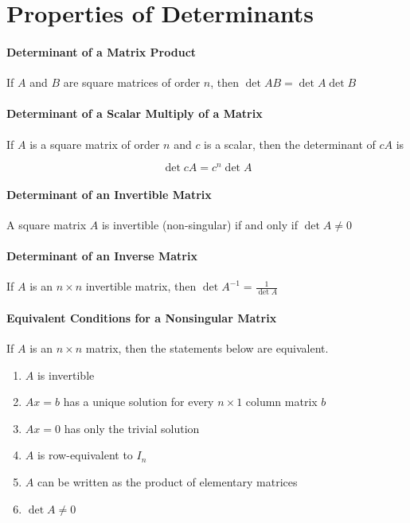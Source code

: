 \documentclass{report}
\begin{document}
\section{Properties of Determinants}

\paragraph{Determinant of a Matrix Product} If $A$ and $B$ are square matrices of order $n$, then $\det{AB} = \det{A}\det{B}$

\paragraph{Determinant of a Scalar Multiply of a Matrix} If $A$ is a square matrix of order $n$ and $c$ is a scalar, then the determinant of $cA$ is 

$$
\det{cA} = c^n \det{A}
$$

\paragraph{Determinant of an Invertible Matrix} A square matrix $A$ is invertible (non-singular) if and only if $\det{A} \ne 0$

\paragraph{Determinant of an Inverse Matrix} If $A$ is an $n \times n$ invertible matrix, then $\det{A^{-1}} = \frac{1}{\det{A}}$

\paragraph{Equivalent Conditions for a Nonsingular Matrix} If $A$ is an $n \times n$ matrix, then the statements below are equivalent.

\begin{enumerate}
    \item $A$ is invertible
    \item $Ax=b$ has a unique solution for every $n \times 1$ column matrix $b$
    \item $Ax=0$ has only the trivial solution
    \item $A$ is row-equivalent to $I_n$
    \item $A$ can be written as the product of elementary matrices
    \item $\det{A} \ne 0$
\end{enumerate}
\end{document}
